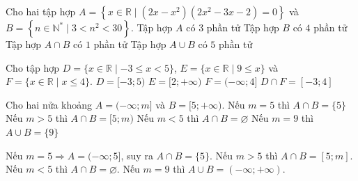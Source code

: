 \begin{ex}%
	Cho hai tập hợp $A=\left\{x \in \mathbb{R}\mid\left(2 x-x^2\right)\left(2 x^2-3 x-2\right)=0\right\}$ và  $B=\left\{n \in \mathbb{N}^* \mid 3<n^2<30\right\}$.
	\choiceTF
	{\True Tập hợp $A$ có $3$ phần tử}
	{\True Tập hợp $B$ có $4$ phần tử}
	{\True Tập hợp $A \cap B$ có $1$ phần tử}
	{Tập hợp $A \cup B$ có $5$ phần tử}
\end{ex}
\begin{ex}%
	Cho tập hợp $D=\{x \in \mathbb{R}\mid-3 \leq x<5\}$, $E=\{x \in \mathbb{R}\mid 9 \leq x\}$ và $F=\{x \in \mathbb{R}\mid x \leq 4\}$.
	\choiceTF
	{\True $D=[-3; 5)$}
	{$E=[2; +\infty)$}
	{\True $F=(-\infty; 4]$}
	{\True $D \cap F=[-3; 4]$}
\loigiai{ Ta có
	\begin{itemchoice}
		\itemch
		$D=[-3; 5)$.
		\itemch
		$E=[9; +\infty)$.
		\itemch
		$F=(-\infty; 4]$.
		\itemch
		$D \cap F=[-3; 4]$.
	\end{itemchoice}
	}
\end{ex}
\begin{ex}%
	Cho hai nửa khoảng $A=(-\infty;m]$ và $B=[5;+\infty)$.
	\choiceTF
	{\True Nếu $m=5$ thì $A\cap B=\{5\}$}
	{Nếu $m>5$ thì $A\cap B=[5;m)$}
	{\True Nếu $m<5$ thì $A\cap B=\varnothing$}
	{Nếu $m=9$ thì $A\cup B=\{9\}$}
	\loigiai
	{
	\begin{itemchoice}
		\itemch Nếu $m=5 \Rightarrow A=(-\infty;5]$, suy ra $A\cap B=\{5\}$.
		\itemch Nếu $m>5$ thì $A\cap B=[5;m]$.
		\itemch Nếu $m<5$ thì $A\cap B=\varnothing$.
		\itemch Nếu $m=9$ thì $A\cup B=(-\infty;+\infty)$.
	\end{itemchoice}
	}
\end{ex}
